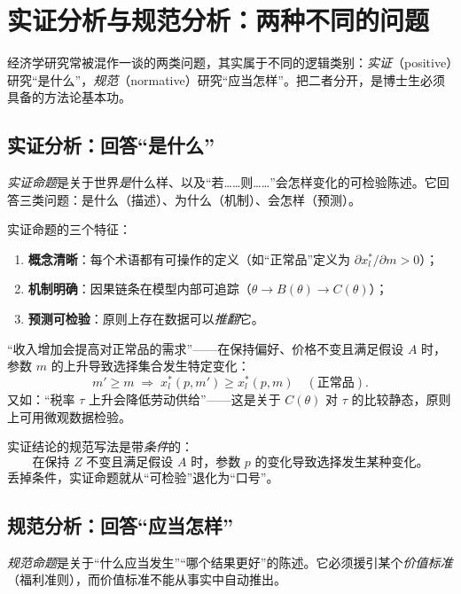 \section{实证分析与规范分析：两种不同的问题}

经济学研究常被混作一谈的两类问题，其实属于不同的逻辑类别：\emph{实证}（positive）研究“是什么”，\emph{规范}（normative）研究“应当怎样”。把二者分开，是博士生必须具备的方法论基本功。

\subsection{实证分析：回答“是什么”}

\begin{definition}[实证命题]
\emph{实证命题}是关于世界\emph{是}什么样、以及“若……则……”会怎样变化的可检验陈述。它回答三类问题：是什么（描述）、为什么（机制）、会怎样（预测）。
\end{definition}

实证命题的三个特征：
\begin{enumerate}
  \item \textbf{概念清晰}：每个术语都有可操作的定义（如“正常品”定义为 $\partial x_l^{*}/\partial m>0$）；
  \item \textbf{机制明确}：因果链条在模型内部可追踪（$\theta\to B(\theta)\to C(\theta)$）；
  \item \textbf{预测可检验}：原则上存在数据可以\emph{推翻}它。
\end{enumerate}

\begin{example}[比较静态是典型实证命题]
“收入增加会提高对正常品的需求”——在保持偏好、价格不变且满足假设 $A$ 时，参数 $m$ 的上升导致选择集合发生特定变化：
\[
m'\ge m \;\Longrightarrow\; x_l^{*}(p,m')\ge x_l^{*}(p,m)\quad(\text{正常品}).
\]
又如：“税率 $\tau$ 上升会降低劳动供给”——这是关于 $C(\theta)$ 对 $\tau$ 的比较静态，原则上可用微观数据检验。
\end{example}

实证结论的规范写法是带\emph{条件}的：
\[
\text{在保持 }Z\text{ 不变且满足假设 }A\text{ 时，参数 }p\text{ 的变化导致选择发生某种变化。}
\]
丢掉条件，实证命题就从“可检验”退化为“口号”。

\subsection{规范分析：回答“应当怎样”}

\begin{definition}[规范命题]
\emph{规范命题}是关于“什么应当发生”“哪个结果更好”的陈述。它必须援引某个\emph{价值标准}（福利准则），而价值标准不能从事实中自动推出。
\end{definition}

